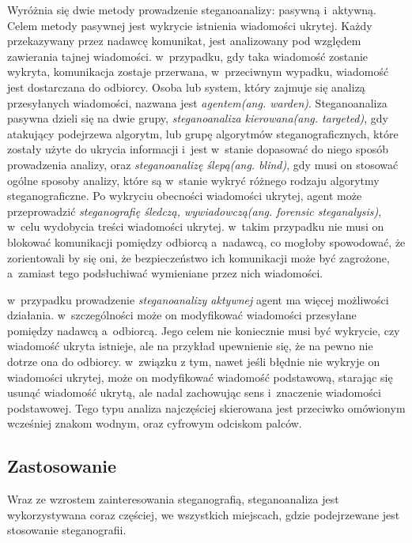 \documentclass[a4paper, twoside, 12pt]{report}
\begin{document}
        Wyróżnia się dwie metody prowadzenie steganoanalizy: pasywną i~aktywną.
        Celem metody pasywnej jest wykrycie istnienia wiadomości ukrytej. Każdy przekazywany
        przez nadawcę komunikat, jest analizowany pod względem zawierania tajnej wiadomości.
        w~przypadku, gdy taka wiadomość zostanie wykryta, komunikacja zostaje przerwana,
        w~przeciwnym wypadku, wiadomość jest dostarczana do odbiorcy. Osoba lub system,
        który zajmuje się analizą przesyłanych wiadomości, nazwana jest \emph{agentem(ang. warden)}.
        Steganoanaliza pasywna dzieli się na dwie grupy, \emph{steganoanaliza kierowana(ang. targeted)}, gdy
        atakujący podejrzewa algorytm, lub grupę algorytmów steganograficznych,
        które zostały użyte do ukrycia informacji i~jest w~stanie dopasować do
        niego sposób prowadzenia analizy, oraz \emph{steganoanalizę ślepą(ang. blind)},
        gdy musi on stosować ogólne sposoby analizy, które są w~stanie wykryć różnego
        rodzaju algorytmy steganograficzne. Po wykryciu obecności wiadomości ukrytej,
        agent może przeprowadzić \emph{steganografię śledczą, wywiadowczą(ang. forensic steganalysis)},
        w~celu wydobycia treści wiadomości ukrytej. w~takim przypadku nie musi on
        blokować komunikacji pomiędzy odbiorcą a~nadawcą, co mogłoby spowodować,
        że zorientowali by się oni, że bezpieczeństwo ich komunikacji może być zagrożone,
        a~zamiast tego podsłuchiwać wymieniane przez nich wiadomości.

        w~przypadku prowadzenie \emph{steganoanalizy aktywnej} agent ma więcej możliwości
        działania. w~szczególności może on modyfikować wiadomości przesyłane pomiędzy
        nadawcą a~odbiorcą. Jego celem nie koniecznie musi być wykrycie, czy wiadomość
        ukryta istnieje, ale na przykład upewnienie się, że na pewno nie dotrze ona
        do odbiorcy. w~związku z tym, nawet jeśli błędnie nie wykryje on wiadomości ukrytej,
        może on modyfikować wiadomość podstawową, starając się usunąć wiadomość ukrytą,
        ale nadal zachowując sens i~znaczenie wiadomości podstawowej. Tego typu analiza
        najczęściej skierowana jest przeciwko omówionym wcześniej znakom wodnym,
        oraz cyfrowym odciskom palców.\cite[Rozdział 13]{DIGITALWATERMARKING}

        \subsection{Zastosowanie}
        Wraz ze wzrostem zainteresowania steganografią, steganoanaliza jest wykorzystywana
        coraz częściej, we wszystkich miejscach, gdzie podejrzewane jest stosowanie
        steganografii.
\end{document}
